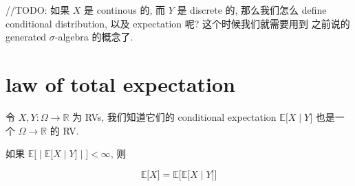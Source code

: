//TODO: 如果 \(\mathit{X}\) 是 continous 的, 而 \(\mathit{Y}\) 是 discrete 的, 那么我们怎么 define conditional distribution, 以及 expectation 呢? 这个时候我们就需要用到 之前说的 generated \(\mathit{\sigma}\)-algebra 的概念了.

\section{law of total expectation}\label{law-of-total-expectation}

\begin{theorem}{}

令 \(\mathit{X},\mathit{Y}:\Omega\rightarrow\mathbb{R}\) 为 RVs, 我们知道它们的 conditional expectation \(\left. \mathbb{E}\lbrack\mathit{X} \middle| \mathit{Y}\rbrack \right.\) 也是一个 \(\Omega\rightarrow\mathbb{R}\) 的 RV.

如果 \(\left. \mathbb{E}\lbrack \middle| \mathbb{E}\lbrack\mathit{X} \middle| \mathit{Y}\rbrack \middle| \rbrack < \infty \right.\), 则

\[\left. \mathbb{E}\lbrack\mathit{X}\rbrack = \mathbb{E}\lbrack\mathbb{E}\lbrack\mathit{X} \middle| \mathit{Y}\rbrack\rbrack \right.\]

\end{theorem}

